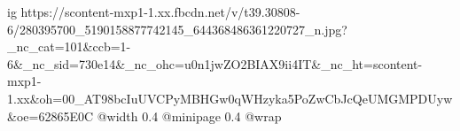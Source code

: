  
 
 
 
 

\ifcmt
  ig https://scontent-mxp1-1.xx.fbcdn.net/v/t39.30808-6/280395700_5190158877742145_644368486361220727_n.jpg?_nc_cat=101&ccb=1-6&_nc_sid=730e14&_nc_ohc=u0n1jwZO2BIAX9ii4IT&_nc_ht=scontent-mxp1-1.xx&oh=00_AT98bcIuUVCPyMBHGw0qWHzyka5PoZwCbJcQeUMGMPDUyw&oe=62865E0C
  @width 0.4
  @minipage 0.4
  @wrap \parpic[r]
\fi
